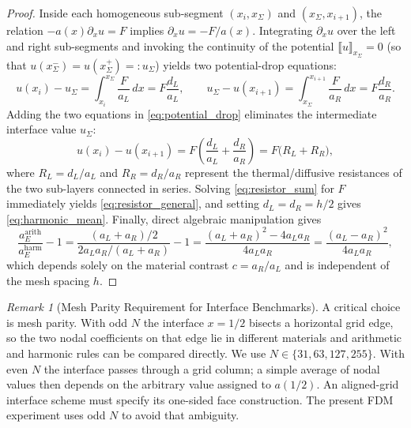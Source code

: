 \documentclass[11pt,a4paper]{article}
\theoremstyle{definition}
\theoremstyle{remark}
\newtheorem{remark}[theorem]{Remark}
\begin{document}
\begin{proof}
	Inside each homogeneous sub-segment $(x_i, x_\Sigma)$ and $(x_\Sigma, x_{i+1})$, the relation $-a(x)\partial_x u = F$ implies $\partial_x u = -F/a(x)$. Integrating $\partial_x u$ over the left and right sub-segments and invoking the continuity of the potential $\llbracket u \rrbracket_{x_\Sigma} = 0$ (so that $u(x_\Sigma^-) = u(x_\Sigma^+) =: u_\Sigma$) yields two potential-drop equations:
	\begin{equation}
		u(x_i) - u_\Sigma = \int_{x_i}^{x_\Sigma} \frac{F}{a_L}\,dx = F\frac{d_L}{a_L}, \qquad
		u_\Sigma - u(x_{i+1}) = \int_{x_\Sigma}^{x_{i+1}} \frac{F}{a_R}\,dx = F\frac{d_R}{a_R}.
		\label{eq:potential_drop}
	\end{equation}
	Adding the two equations in \eqref{eq:potential_drop} eliminates the intermediate interface value $u_\Sigma$:
	\begin{equation}
		u(x_i) - u(x_{i+1}) = F\left(\frac{d_L}{a_L} + \frac{d_R}{a_R}\right) = F\bigl(R_L + R_R\bigr),
		\label{eq:resistor_sum}
	\end{equation}
	where $R_L = d_L/a_L$ and $R_R = d_R/a_R$ represent the thermal/diffusive resistances of the two sub-layers connected in series. Solving \eqref{eq:resistor_sum} for $F$ immediately yields \eqref{eq:resistor_general}, and setting $d_L = d_R = h/2$ gives \eqref{eq:harmonic_mean}. Finally, direct algebraic manipulation gives
	\[
	\frac{a_E^{\text{arith}}}{a_E^{\text{harm}}} - 1 = \frac{(a_L + a_R)/2}{2a_L a_R / (a_L + a_R)} - 1 = \frac{(a_L + a_R)^2 - 4a_L a_R}{4a_L a_R} = \frac{(a_L - a_R)^2}{4a_L a_R},
	\]
	which depends solely on the material contrast $c = a_R/a_L$ and is independent of the mesh spacing $h$.
\end{proof}

\begin{remark}[Mesh Parity Requirement for Interface Benchmarks]
	\label{rem:mesh_parity}
	A critical choice is mesh parity. With odd $N$ the interface
$x=1/2$ bisects a horizontal grid edge, so the two nodal coefficients on
that edge lie in different materials and arithmetic and harmonic rules can
be compared directly. We use $N\in\{31,63,127,255\}$. With even $N$ the
interface passes through a grid column; a simple average of nodal values
then depends on the arbitrary value assigned to $a(1/2)$. An aligned-grid
interface scheme must specify its one-sided face construction. The present
FDM experiment uses odd $N$ to avoid that ambiguity.
\end{remark}
\end{document}
